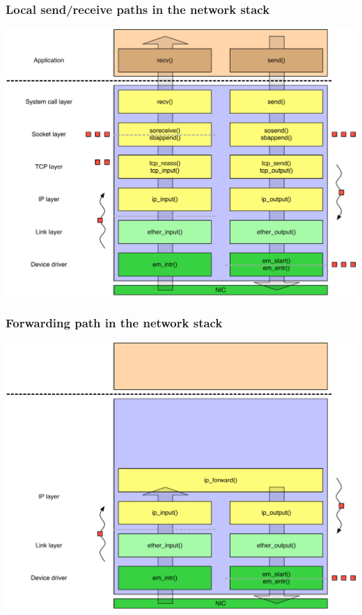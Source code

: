 \begin{frame}
  \frametitle{Local send/receive paths in the network stack}
  \begin{center}
    \includegraphics[scale=0.4]{../../figures/network-in-out.pdf}
  \end{center}
\end{frame}

\begin{frame}
  \frametitle{Forwarding path in the network stack}
  \begin{center}
    \includegraphics[scale=0.4]{../../figures/network-forward.pdf}
  \end{center}
\end{frame}

